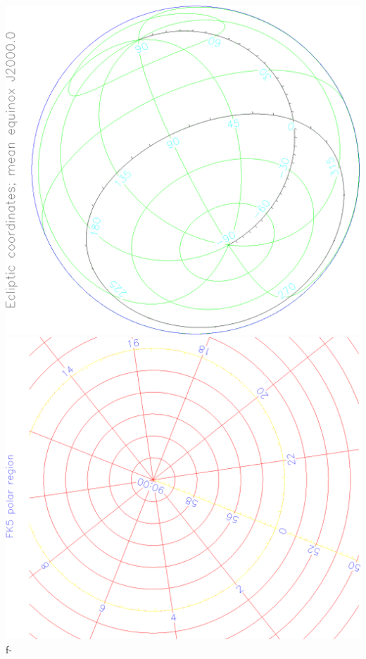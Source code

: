 \documentclass[twoside,11pt]{article}
\begin{document}
\begin{htmlonly}
   \includegraphics[scale=0.3,angle=-90]{sun210_figures/frontb.eps}\hfill
   \includegraphics[scale=0.3,angle=-90]{sun210_figures/frontc.eps}
f-


\end{htmlonly}
\end{document}
